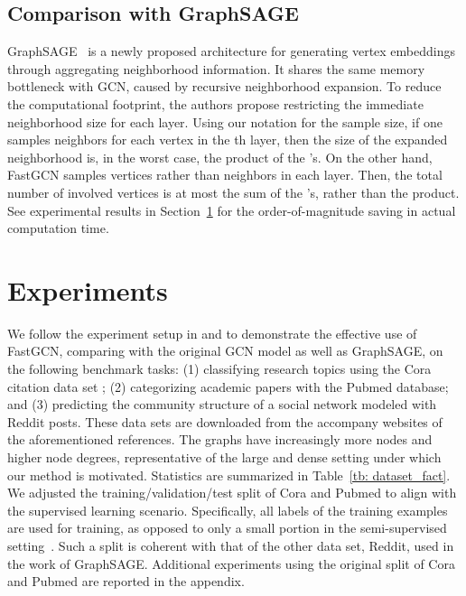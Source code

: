 \documentclass{article} \usepackage{iclr2018_conference,times}
\theoremstyle{plain}\newtheorem{theorem}{Theorem}\theoremstyle{plain}\newtheorem{proposition}[theorem]{Proposition}
\theoremstyle{plain}\newtheorem{corollary}[theorem]{Corollary}
\theoremstyle{plain}\newtheorem{lemma}[theorem]{Lemma}
\begin{document}
\subsection{Comparison with GraphSAGE}\label{sec:graphsage}
GraphSAGE~\citep{DBLP:journals/corr/HamiltonYL17} is a newly proposed architecture for generating vertex embeddings through aggregating neighborhood information. It shares the same memory bottleneck with GCN, caused by recursive neighborhood expansion. To reduce the computational footprint, the authors propose restricting the immediate neighborhood size for each layer. Using our notation for the sample size, if one samples  neighbors for each vertex in the th layer, then the size of the expanded neighborhood is, in the worst case, the product of the 's. On the other hand, FastGCN samples vertices rather than neighbors in each layer. Then, the total number of involved vertices is at most the sum of the 's, rather than the product. See experimental results in Section~\ref{sec:exp} for the order-of-magnitude saving in actual computation time.



\section{Experiments}\label{sec:exp}
We follow the experiment setup in \cite{DBLP:journals/corr/KipfW16} and \cite{DBLP:journals/corr/HamiltonYL17} to demonstrate the effective use of FastGCN, comparing with the original GCN model as well as GraphSAGE, on the following benchmark tasks: (1) classifying research topics using the Cora citation data set \citep{McCallum:2000:ACI:593959.594002}; (2) categorizing academic papers with the Pubmed database; and (3) predicting the community structure of a social network modeled with Reddit posts. These data sets are downloaded from the accompany websites of the aforementioned references. The graphs have increasingly more nodes and higher node degrees, representative of the large and dense setting under which our method is motivated. Statistics are summarized in Table~\ref{tb: dataset_fact}. We adjusted the training/validation/test split of Cora and Pubmed to align with the supervised learning scenario. Specifically, all labels of the training examples are used for training, as opposed to only a small portion in the semi-supervised setting~\citep{DBLP:journals/corr/KipfW16}. Such a split is  coherent with that of the other data set, Reddit, used in the work of GraphSAGE. Additional experiments using the original split of Cora and Pubmed are reported in the appendix.
\end{document}
